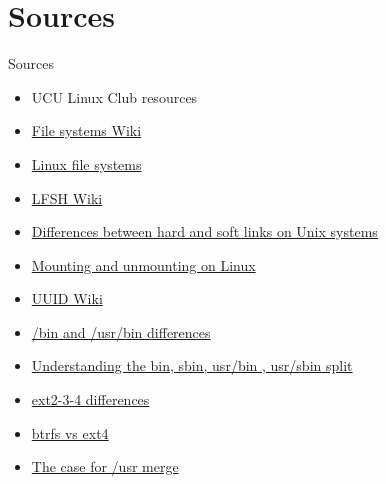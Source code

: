 \documentclass[usenames,dvipsnames,10pt,aspectratio=169]{beamer}
\begin{document}
\section{Sources}
\begin{frame}{Sources}
    \begin{itemize}
        \item UCU Linux Club resources
        \item \href{https://en.wikipedia.org/wiki/File_system}{File systems Wiki}
        \item \href{https://www.javatpoint.com/linux-files}{Linux file systems}
        \item \href{https://en.wikipedia.org/wiki/Filesystem_Hierarchy_Standard}{LFSH Wiki}
        \item \href{http://www.differencebetween.net/technology/difference-between-soft-link-and-hard-link-in-unix-in-os/}{Differences between hard and soft links on Unix systems}
        \item \href{https://techviewleo.com/mounting-and-unmounting-filesystems-on-linux/}{Mounting and unmounting on Linux}
        \item \href{https://en.wikipedia.org/wiki/Universally_unique_identifier}{UUID Wiki}
        \item \href{https://unix.stackexchange.com/questions/5915/difference-between-bin-and-usr-bin}{/bin and /usr/bin differences}
        \item \href{http://lists.busybox.net/pipermail/busybox/2010-December/074114.html}{Understanding the bin, sbin, usr/bin , usr/sbin split}
        \item \href{https://www.thegeekstuff.com/2011/05/ext2-ext3-ext4/}{ext2-3-4 differences}
        \item \href{https://linuxhint.com/btrfs-vs-ext4-filesystems-comparison/}{btrfs vs ext4}
        \item \href{https://www.freedesktop.org/wiki/Software/systemd/TheCaseForTheUsrMerge/}{The case for /usr merge}
    \end{itemize}
\end{frame}
\end{document}

